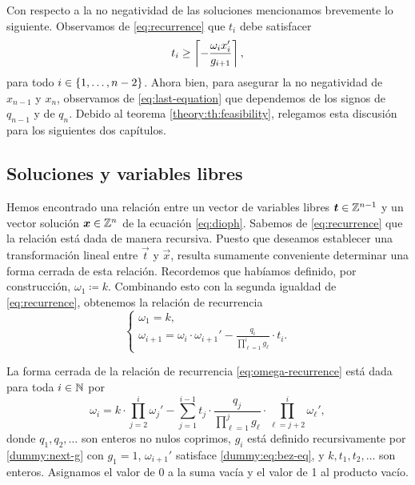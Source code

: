 Con respecto a la no negatividad de las soluciones mencionamos brevemente lo siguiente.
Observamos de \eqref{eq:recurrence} que $t_i$ debe satisfacer
\begin{equation}
	\label{eq:param-lb}
	t_i \geq \left\lceil -\frac{\omega_ix_i'}{g_{i + 1}} \right\rceil,
\end{equation}
para todo $i \in \lbrace 1, \ldots, n - 2 \rbrace$. Ahora bien, para asegurar la no negatividad de
$x_{n-1}$ y $x_n$, observamos de \eqref{eq:last-equation} que dependemos de los signos de $q_{n-1}$
y de $q_n$. Debido al teorema \ref{theory:th:feasibility}, relegamos esta discusión para los
siguientes dos capítulos.

\subsection{Soluciones y variables libres}
\label{subsec:linear}
\noindent
Hemos encontrado una relación entre un vector de variables libres $\boldsymbol{t} \in \mathbb{Z}^{n-1}$
y un vector solución $\boldsymbol{x} \in \mathbb{Z}^n$ de la ecuación \eqref{eq:dioph}. Sabemos de
\eqref{eq:recurrence} que la relación está dada de manera recursiva. Puesto que deseamos establecer
una transformación lineal entre $\vec{t}$ y $\vec{x}$, resulta sumamente conveniente determinar una
forma cerrada de esta relación. Recordemos que habíamos definido, por construcción, $\omega_1
\coloneq k$. Combinando esto con la segunda igualdad de \eqref{eq:recurrence}, obtenemos la relación
de recurrencia
\begin{equation}
	\label{eq:omega-recurrence}
	\begin{cases}
		\omega_1 = k, \\
		\omega_{i + 1} = \omega_i \cdot \omega_{i + 1}' - \frac{q_i}{\prod_{\ell=1}^{i}g_\ell} \cdot t_i.
	\end{cases}
\end{equation}
\begin{lemma}
	La forma cerrada de la relación de recurrencia \eqref{eq:omega-recurrence} está dada para toda
	$i \in \mathbb{N}$ por
	\begin{equation}
		\label{eq:omega-formula}
		\omega_i =
		k \cdot \prod_{j=2}^{i} \omega_j'
		- \sum_{j=1}^{i - 1}
		t_j \cdot
		\frac{q_j}{\prod_{\ell=1}^{j}g_\ell}
		\cdot \prod_{\ell=j+2}^{i}\omega_\ell',
	\end{equation}
	donde $q_1, q_2, \ldots$ son enteros no nulos coprimos, $g_i$ está definido
	recursivamente por \eqref{dummy:next-g} con $g_1 = 1$, $\omega_{i + 1}'$ satisface
	\eqref{dummy:eq:bez-eq}, y $k, t_1, t_2, \ldots$ son enteros.
	Asignamos el valor de 0 a la suma vacía y el valor de 1 al producto vacío.
\end{lemma}
